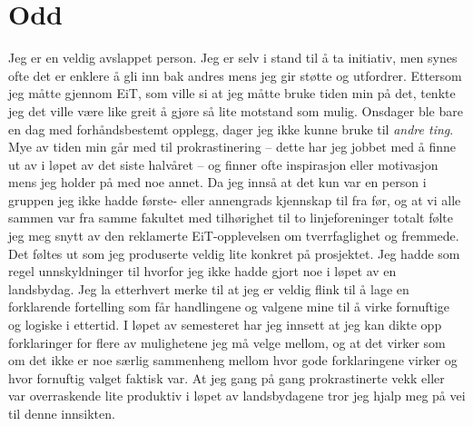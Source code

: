 \section{Odd}
Jeg er en veldig avslappet person.
Jeg er selv i stand til å ta initiativ, men synes ofte det er enklere å gli inn bak andres mens jeg gir støtte og utfordrer.
Ettersom jeg måtte gjennom EiT, som ville si at jeg måtte bruke tiden min på det, tenkte jeg det ville være like greit å gjøre så lite motstand som mulig.
Onsdager ble bare en dag med forhåndsbestemt opplegg, dager jeg ikke kunne bruke til \textit{andre ting}.
Mye av tiden min går med til prokrastinering -- dette har jeg jobbet med å finne ut av i løpet av det siste halvåret -- og finner ofte inspirasjon eller motivasjon mens jeg holder på med noe annet.
Da jeg innså at det kun var en person i gruppen jeg ikke hadde første- eller annengrads kjennskap til fra før, og at vi alle sammen var fra samme fakultet med tilhørighet til to linjeforeninger totalt følte jeg meg snytt av den reklamerte EiT-opplevelsen om tverrfaglighet og fremmede.
Det føltes ut som jeg produserte veldig lite konkret på prosjektet.
Jeg hadde som regel unnskyldninger til hvorfor jeg ikke hadde gjort noe i løpet av en landsbydag.
Jeg la etterhvert merke til at jeg er veldig flink til å lage en forklarende fortelling som får handlingene og valgene mine til å virke fornuftige og logiske i ettertid.
I løpet av semesteret har jeg innsett at jeg kan dikte opp forklaringer for flere av mulighetene jeg må velge mellom, og at det virker som om det ikke er noe særlig sammenheng mellom hvor gode forklaringene virker og hvor fornuftig valget faktisk var.
At jeg gang på gang prokrastinerte vekk eller var overraskende lite produktiv i løpet av landsbydagene tror jeg hjalp meg på vei til denne innsikten.
